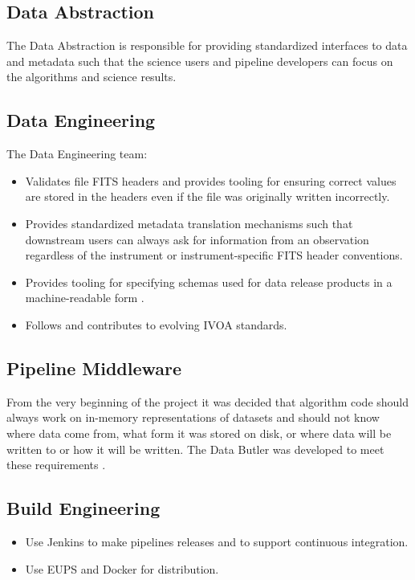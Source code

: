 \subsection{Data Abstraction} \label{sec:dataabstraction}

The Data Abstraction is responsible for providing standardized interfaces to data and metadata such that the science users and pipeline developers can focus on the algorithms and science results.

\subsection{Data Engineering}

The Data Engineering team:

\begin{itemize}
\item Validates file FITS headers and provides tooling for ensuring correct values are stored in the headers even if the file was originally written incorrectly.
\item Provides standardized metadata translation mechanisms such that downstream users can always ask for information from an observation regardless of the instrument or instrument-specific FITS header conventions.
\item Provides tooling for specifying schemas used for data release products in a machine-readable form \citep{DMTN-153}.
\item Follows and contributes to evolving IVOA standards.
\end{itemize}

\subsection{Pipeline Middleware}

From the very beginning of the project it was decided that algorithm code should always work on in-memory representations of datasets and should not know where data come from, what form it was stored on disk, or where data will be written to or how it will be written.
The Data Butler was developed to meet these requirements \citep{DMTN-288,2022SPIE12189E..11J}.

\subsection{Build Engineering}

\begin{itemize}
\item Use Jenkins to make pipelines releases and to support continuous integration.
\item Use EUPS and Docker for distribution.
\end{itemize}
